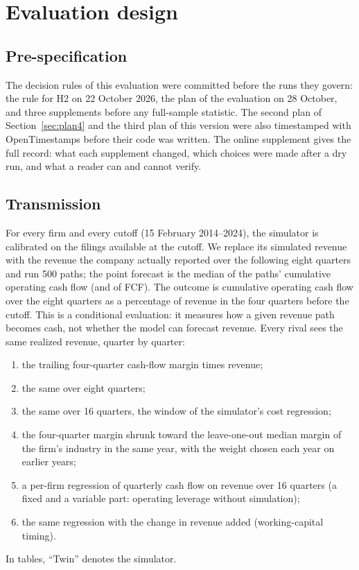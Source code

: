 \documentclass[preprint,12pt,authoryear]{elsarticle}
\begin{document}
\section{Evaluation design}\label{sec:design}

\subsection{Pre-specification}\label{sec:prespec}
The decision rules of this evaluation were committed before the runs they govern: the rule for H2 on 22 October 2026, the plan of the evaluation on 28 October, and three supplements before any full-sample statistic. The second plan of Section~\ref{sec:plan4} and the third plan of this version were also timestamped with OpenTimestamps before their code was written. The online supplement gives the full record: what each supplement changed, which choices were made after a dry run, and what a reader can and cannot verify.

\subsection{Transmission}
For every firm and every cutoff (15 February 2014--2024), the simulator is calibrated on the filings available at the cutoff. We replace its simulated revenue with the revenue the company actually reported over the following eight quarters and run 500 paths; the point forecast is the median of the paths' cumulative operating cash flow (and of FCF). The outcome is cumulative operating cash flow over the eight quarters as a percentage of revenue in the four quarters before the cutoff. This is a conditional evaluation: it measures how a given revenue path becomes cash, not whether the model can forecast revenue. Every rival sees the same realized revenue, quarter by quarter:
\begin{enumerate}
\item the trailing four-quarter cash-flow margin times revenue;
\item the same over eight quarters;
\item the same over 16 quarters, the window of the simulator's cost regression;
\item the four-quarter margin shrunk toward the leave-one-out median margin of the firm's industry in the same year, with the weight chosen each year on earlier years;
\item a per-firm regression of quarterly cash flow on revenue over 16 quarters (a fixed and a variable part: operating leverage without simulation);
\item the same regression with the change in revenue added (working-capital timing).
\end{enumerate}
\noindent In tables, ``Twin'' denotes the simulator.
\end{document}
